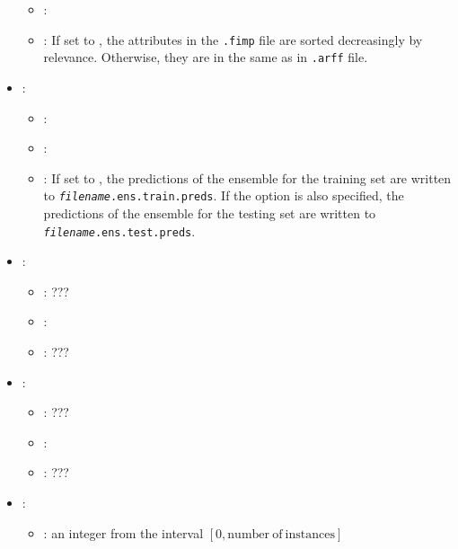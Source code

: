 \begin{itemize}
\begin{itemize}
                \item \optionDefaultValue{}: 
                \item \optionDescrption{}: If set to , the attributes in the \texttt{.fimp} file are sorted decreasingly by relevance. Otherwise, they are in the same as in \texttt{.arff} file.
           \end{itemize}
    \item {}:
           \begin{itemize}
                \item \optionPossibleValues{}: 
                \item \optionDefaultValue{}: 
                \item \optionDescrption{}: If set to , the predictions of the ensemble for the training set are written to \texttt{{\em filename}.ens.train.preds}.
                If the option  is also specified,  the predictions of the ensemble for the testing set are written to \texttt{{\em filename}.ens.test.preds}.
           \end{itemize}
    \item {}:
           \begin{itemize}
                \item \optionPossibleValues{}: ???
                \item \optionDefaultValue{}: 
                \item \optionDescrption{}: ???
           \end{itemize}
    \item {}:
           \begin{itemize}
                \item \optionPossibleValues{}: ???
                \item \optionDefaultValue{}: 
                \item \optionDescrption{}: ???
           \end{itemize}
    \item {}:
           \begin{itemize}
                \item \optionPossibleValues{}: an integer from the interval $[0, \mathrm{number\ of\ instances}]$

\end{itemize}
\end{itemize}
